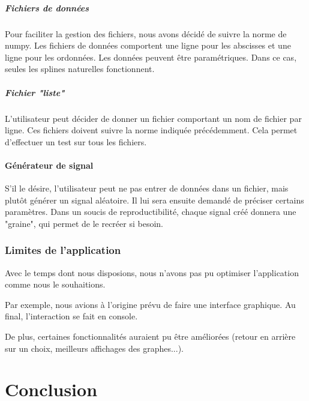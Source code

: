 \documentclass[a4paper,12pt]{article} %
\begin{document}
\subsubsection{Fichiers de données}

Pour faciliter la gestion des fichiers, nous avons décidé de suivre la norme de numpy. Les fichiers de données comportent une ligne pour les abscisses et une ligne pour les ordonnées.
Les données peuvent être paramétriques. Dans ce cas, seules les splines naturelles fonctionnent.

\subsubsection{Fichier "liste"}

L'utilisateur peut décider de donner un fichier comportant un nom de fichier par ligne.
Ces fichiers doivent suivre la norme indiquée précédemment. Cela permet d'effectuer un test sur tous les fichiers.

\subsection{Générateur de signal}

S'il le désire, l'utilisateur peut ne pas entrer de données dans un fichier, mais plutôt générer un signal aléatoire. Il lui sera ensuite demandé de préciser certains paramètres. Dans un soucis de reproductibilité, chaque signal créé donnera une "graine", qui permet de le recréer si besoin.

\section{Limites de l'application}

Avec le temps dont nous disposions, nous n'avons pas pu optimiser l'application comme nous le souhaitions.

Par exemple, nous avions à l'origine prévu de faire une interface graphique. Au final, l'interaction se fait en console.

De plus, certaines fonctionnalités auraient pu être améliorées (retour en arrière sur un choix, meilleurs affichages des graphes...).


\renewcommand\partname{}
\part{Conclusion}
\end{document}
